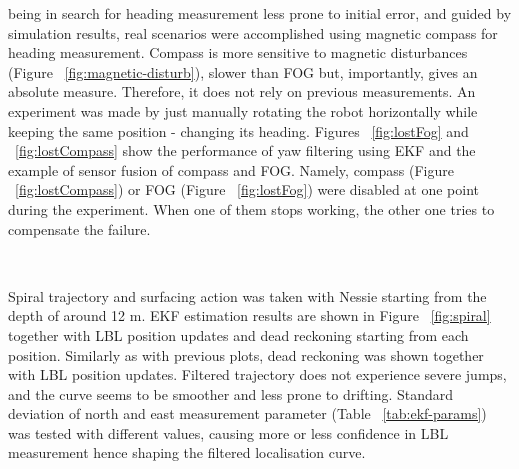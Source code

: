  being in search for heading measurement less prone to initial error, and guided by simulation results, real scenarios were accomplished using magnetic compass for heading measurement. Compass is more sensitive to magnetic disturbances (Figure ~\ref{fig:magnetic-disturb}), slower than FOG but, importantly, gives an absolute measure. Therefore, it does not rely on previous measurements. An experiment was made by just manually rotating the robot horizontally while keeping the same position - changing its heading. Figures ~\ref{fig:lostFog} and ~\ref{fig:lostCompass} show the performance of yaw filtering using EKF and the example of sensor fusion of compass and FOG. Namely, compass (Figure ~\ref{fig:lostCompass}) or FOG (Figure ~\ref{fig:lostFog}) were disabled at one point during the experiment. When one of them stops working, the other one tries to compensate the failure. 
\begin{figure}%
  \centering
     \\   
\end{figure}

 Spiral trajectory and surfacing action was taken with Nessie starting from the depth of around 12 m. EKF estimation results are shown in Figure ~\ref{fig:spiral} together with LBL position updates and dead reckoning starting from each position. Similarly as with previous plots, dead reckoning was shown together with LBL position updates. Filtered trajectory does not experience severe jumps, and the curve seems to be smoother and less prone to drifting. Standard deviation of north and east measurement parameter (Table ~\ref{tab:ekf-params}) was tested with different values, causing more or less confidence in LBL measurement hence shaping the filtered localisation curve. 

